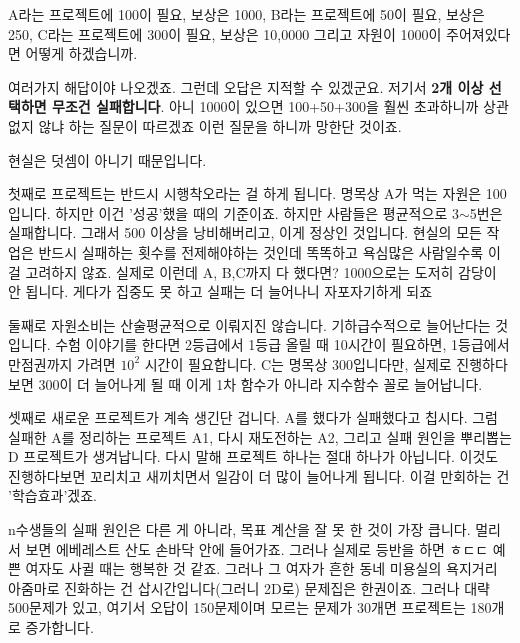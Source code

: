 A라는 프로젝트에 100이 필요, 보상은 1000, B라는 프로젝트에 50이 필요, 보상은 250, C라는 프로젝트에 300이 필요, 보상은 10,0000
그리고 자원이 1000이 주어져있다면 어떻게 하겠습니까.
\vspace{5mm}

여러가지 해답이야 나오겠죠.
그런데 오답은 지적할 수 있겠군요. 저기서 \textbf{2개 이상 선택하면 무조건 실패합니다}.
아니 1000이 있으면 100+50+300을 훨씬 초과하니까 상관없지 않냐 하는 질문이 따르겠죠
이런 질문을 하니까 망한단 것이죠.
\vspace{5mm}

현실은 덧셈이 아니기 때문입니다.
\vspace{5mm}

첫째로 프로젝트는 반드시 시행착오라는 걸 하게 됩니다.
명목상 A가 먹는 자원은 100입니다. 하지만 이건 '성공'했을 때의 기준이죠.
하지만 사람들은 평균적으로 3$\sim$5번은 실패합니다. 그래서 500 이상을 낭비해버리고, 이게 정상인 것입니다.
현실의 모든 작업은 반드시 실패하는 횟수를 전제해야하는 것인데 똑똑하고 욕심많은 사람일수록 이걸 고려하지 않죠.
실제로 이런데 A, B,C까지 다 했다면? 1000으로는 도저히 감당이 안 됩니다. 게다가 집중도 못 하고 실패는 더 늘어나니 자포자기하게 되죠
\vspace{5mm}

둘째로 자원소비는 산술평균적으로 이뤄지진 않습니다. 기하급수적으로 늘어난다는 것입니다.
수험 이야기를 한다면 2등급에서 1등급 올릴 때 10시간이 필요하면, 1등급에서 만점권까지 가려면 $10^2$ 시간이 필요합니다.
C는 명목상 300입니다만, 실제로 진행하다보면 300이 더 늘어나게 될 때 이게 1차 함수가 아니라 지수함수 꼴로 늘어납니다.
\vspace{5mm}

셋째로 새로운 프로젝트가 계속 생긴단 겁니다.
A를 했다가 실패했다고 칩시다. 그럼 실패한 A를 정리하는 프로젝트 A1, 다시 재도전하는 A2, 그리고 실패 원인을 뿌리뽑는 D 프로젝트가 생겨납니다.
다시 말해 프로젝트 하나는 절대 하나가 아닙니다. 이것도 진행하다보면 꼬리치고 새끼치면서 일감이 더 많이 늘어나게 됩니다.
이걸 만회하는 건 '학습효과'겠죠.
\vspace{5mm}

n수생들의 실패 원인은 다른 게 아니라, 목표 계산을 잘 못 한 것이 가장 큽니다.
멀리서 보면 에베레스트 산도 손바닥 안에 들어가죠. 그러나 실제로 등반을 하면 ㅎㄷㄷ
예쁜 여자도 사귈 때는 행복한 것 같죠. 그러나 그 여자가 흔한 동네 미용실의 욕지거리 아줌마로 진화하는 건 삽시간입니다(그러니 2D로)
문제집은 한권이죠. 그러나 대략 500문제가 있고, 여기서 오답이 150문제이며 모르는 문제가 30개면 프로젝트는 180개로 증가합니다.
\vspace{5mm}

